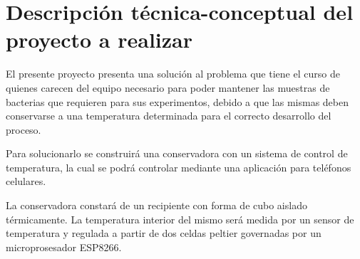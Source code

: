 \section{Descripción técnica-conceptual del proyecto a realizar}
\label{sec:descripcion}

\quad El presente proyecto presenta una solución al problema que tiene el curso de \empclientename\hspace{1px} quienes carecen del equipo necesario para poder mantener las muestras de bacterias que requieren para sus experimentos, debido a que las mismas deben conservarse a una temperatura determinada para el correcto desarrollo del proceso.

\quad Para solucionarlo se construirá una conservadora con un sistema de control de temperatura, la cual se podrá controlar mediante una aplicación para teléfonos celulares.

\quad La conservadora constará de un recipiente con forma de cubo aislado térmicamente. La temperatura interior del mismo será medida por un sensor de temperatura y regulada a partir de dos celdas peltier governadas por un microprosesador ESP8266. 